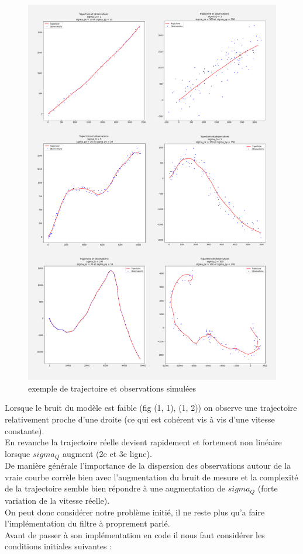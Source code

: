\begin{figure}[hbt!]
	\centering
	\includegraphics[scale=0.3]{./images/init.png}
	\caption{\centering exemple de trajectoire et observations simulées}
	\label{fig:init_out}
\end{figure}
\FloatBarrier

Lorsque le bruit du modèle est faible (fig (1, 1), (1, 2)) on observe une trajectoire relativement proche d'une droite (ce qui est cohérent vis à vis d'une vitesse constante).\\
En revanche la trajectoire réelle devient rapidement et fortement non linéaire lorsque $sigma_{Q}$ augment (2e et 3e ligne). \\
De manière générale l'importance de la dispersion des observations autour de la vraie courbe corrèle bien avec l'augmentation du bruit de mesure et la complexité de la trajectoire semble bien répondre à une augmentation de $sigma_{Q}$ (forte variation de la vitesse réelle).\\
On peut donc considérer notre problème initié, il ne reste plus qu'a faire l'implémentation du filtre à proprement parlé.\\
Avant de passer à son implémentation en code il nous faut considérer les conditions initiales suivantes :

